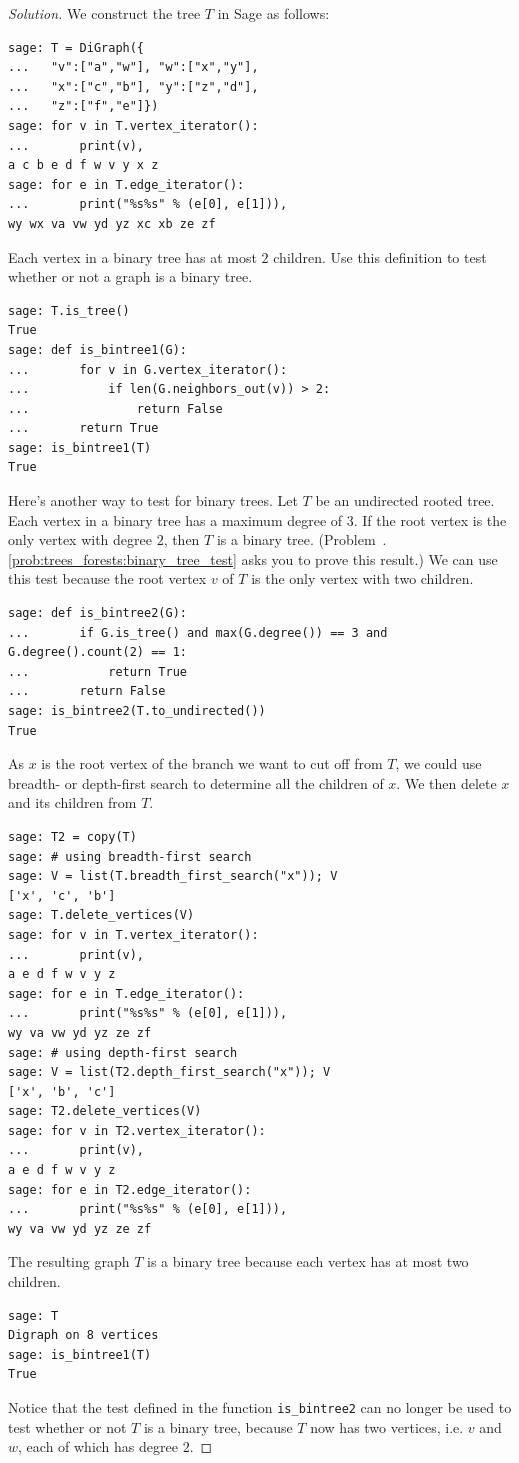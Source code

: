 \begin{proof}[Solution]
We construct the tree $T$ in Sage as follows:
\begin{lstlisting}
sage: T = DiGraph({
...   "v":["a","w"], "w":["x","y"],
...   "x":["c","b"], "y":["z","d"],
...   "z":["f","e"]})
sage: for v in T.vertex_iterator():
...       print(v),
a c b e d f w v y x z
sage: for e in T.edge_iterator():
...       print("%s%s" % (e[0], e[1])),
wy wx va vw yd yz xc xb ze zf
\end{lstlisting}
Each vertex in a binary tree has at most $2$ children. Use this
definition to test whether or not a graph is a binary tree.
\begin{lstlisting}
sage: T.is_tree()
True
sage: def is_bintree1(G):
...       for v in G.vertex_iterator():
...           if len(G.neighbors_out(v)) > 2:
...               return False
...       return True
sage: is_bintree1(T)
True
\end{lstlisting}
Here's another way to test for binary trees. Let $T$ be an undirected
rooted tree. Each vertex in a binary tree has a maximum degree of
$3$. If the root vertex is the only vertex with degree $2$, then $T$
is a binary tree.
(Problem~\thechapter.\ref{prob:trees_forests:binary_tree_test} asks
you to prove this result.) We can use this test because the root
vertex $v$ of $T$ is the only vertex with two children.
\begin{lstlisting}
sage: def is_bintree2(G):
...       if G.is_tree() and max(G.degree()) == 3 and G.degree().count(2) == 1:
...           return True
...       return False
sage: is_bintree2(T.to_undirected())
True
\end{lstlisting}
As $x$ is the root vertex of the branch we want to cut off from $T$,
we could use breadth- or depth-first search to determine all the
children of $x$. We then delete $x$ and its children from $T$.
\begin{lstlisting}
sage: T2 = copy(T)
sage: # using breadth-first search
sage: V = list(T.breadth_first_search("x")); V
['x', 'c', 'b']
sage: T.delete_vertices(V)
sage: for v in T.vertex_iterator():
...       print(v),
a e d f w v y z
sage: for e in T.edge_iterator():
...       print("%s%s" % (e[0], e[1])),
wy va vw yd yz ze zf
sage: # using depth-first search
sage: V = list(T2.depth_first_search("x")); V
['x', 'b', 'c']
sage: T2.delete_vertices(V)
sage: for v in T2.vertex_iterator():
...       print(v),
a e d f w v y z
sage: for e in T2.edge_iterator():
...       print("%s%s" % (e[0], e[1])),
wy va vw yd yz ze zf
\end{lstlisting}
The resulting graph $T$ is a binary tree because each vertex has at
most two children.
\begin{lstlisting}
sage: T
Digraph on 8 vertices
sage: is_bintree1(T)
True
\end{lstlisting}
Notice that the test defined in the function \verb!is_bintree2! can no
longer be used to test whether or not $T$ is a binary tree, because
$T$ now has two vertices, i.e. $v$ and $w$, each of which has degree $2$.
\end{proof}


